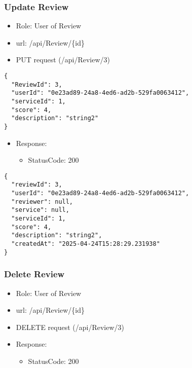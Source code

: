 \documentclass[11pt]{article}
\begin{document}
\subsubsection{Update Review}
\label{sec:orgc8f46c9}
\begin{itemize}
\item Role: User of Review
\item url: /api/Review/\{id\}
\item PUT request (/api/Review/3)
\end{itemize}
\begin{verbatim}
{
  "ReviewId": 3,
  "userId": "0e23ad89-24a8-4ed6-ad2b-529fa0063412",
  "serviceId": 1,
  "score": 4,
  "description": "string2"
}
\end{verbatim}
\begin{itemize}
\item Response:
\begin{itemize}
\item StatusCode: 200
\end{itemize}
\end{itemize}
\begin{verbatim}
{
  "reviewId": 3,
  "userId": "0e23ad89-24a8-4ed6-ad2b-529fa0063412",
  "reviewer": null,
  "service": null,
  "serviceId": 1,
  "score": 4,
  "description": "string2",
  "createdAt": "2025-04-24T15:28:29.231938"
}
\end{verbatim}
\subsubsection{Delete Review}
\label{sec:orge96367c}
\begin{itemize}
\item Role: User of Review
\item url: /api/Review/\{id\}
\item DELETE request (/api/Review/3)
\item Response:
\begin{itemize}
\item StatusCode: 200
\end{itemize}
\end{itemize}
\end{document}
